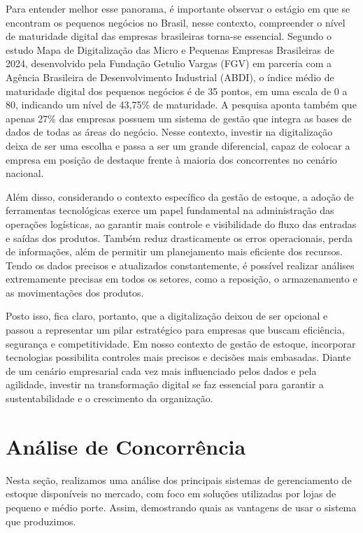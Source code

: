 \documentclass[
	12pt,				%
	openright,			%
	twoside,			%
	a4paper,			%
	english,			%
	french,				%
	spanish,			%
	brazil				%
	]{abntex2}
\begin{document}
Para entender melhor esse panorama, é importante observar o estágio em que se encontram os pequenos negócios no Brasil, nesse contexto, compreender o nível de maturidade digital das empresas brasileiras torna-se essencial. Segundo o estudo Mapa de Digitalização das Micro e Pequenas Empresas Brasileiras de 2024, desenvolvido pela Fundação Getulio Vargas (FGV) em parceria com a Agência Brasileira de Desenvolvimento Industrial (ABDI), o índice médio de maturidade digital dos pequenos negócios é de 35 pontos, em uma escala de 0 a 80, indicando um nível de 43,75\% de maturidade. A pesquisa aponta também que apenas 27\% das empresas possuem um sistema de gestão que integra as bases de dados de todas as áreas do negócio. Nesse contexto, investir na digitalização deixa de ser uma escolha e passa a ser um grande diferencial, capaz de colocar a empresa em posição de destaque frente à maioria dos concorrentes no cenário nacional.

Além disso, considerando o contexto específico da gestão de estoque, a adoção de ferramentas tecnológicas exerce um papel fundamental na administração das operações logísticas, ao garantir mais controle e visibilidade do fluxo das entradas e saídas dos produtos. Também reduz drasticamente os erros operacionais, perda de informações, além de permitir um planejamento mais eficiente dos recursos. Tendo os dados precisos e atualizados constantemente, é possível realizar análises extremamente precisas em todos os setores, como a reposição, o armazenamento e as movimentações dos produtos.

Posto isso, fica claro, portanto, que a digitalização deixou de ser opcional e passou a representar um pilar estratégico para empresas que buscam eficiência, segurança e competitividade. Em nosso contexto de gestão de estoque, incorporar tecnologias possibilita controles mais precisos e decisões mais embasadas. Diante de um cenário empresarial cada vez mais influenciado pelos dados e pela agilidade, investir na transformação digital se faz essencial para garantir a sustentabilidade e o crescimento da organização.

\section{Análise de Concorrência}

Nesta seção, realizamos uma análise dos principais sistemas de gerenciamento de estoque disponíveis no mercado, com foco em soluções utilizadas por lojas de pequeno e médio porte. Assim, demostrando quais as vantagens de usar o sistema que produzimos.
\end{document}
